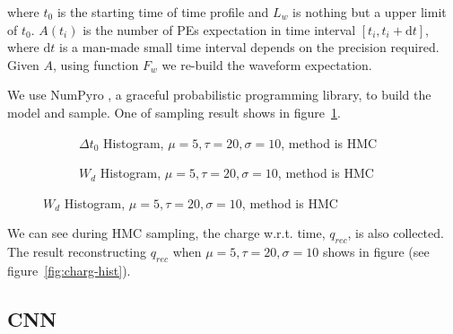 where $t_{0}$ is the starting time of time profile and $L_{w}$ is nothing but a upper limit of $t_{0}$. $A(t_{i})$ is the number of PEs expectation in time interval $[t_{i}, t_{i}+\mathrm{d}t]$, where $\mathrm{d}t$ is a man-made small time interval depends on the precision required. Given $A$, using function $F_{w}$ we re-build the waveform expectation. 

We use NumPyro \cite{phan2019composable}, a graceful probabilistic programming library, to build the model and sample. One of sampling result shows in figure~\ref{fig:mcmcrec-t0hist}. 

\begin{figure}[H]
\begin{minipage}[t]{.5\textwidth}
\begin{figure}[H]
    \centering
    \resizebox{\textwidth}{!}{}
    \caption{\label{fig:mcmcrec-t0hist} $\Delta t_{0}$ Histogram, $\mu=5, \tau=20, \sigma=10$, method is HMC}
\end{figure}
\end{minipage}
\begin{minipage}[t]{.5\textwidth}
\begin{figure}[H]
    \centering
    \resizebox{\textwidth}{!}{}
    \caption{\label{fig:mcmcrec-chargehist} $W_{d}$ Histogram, $\mu=5, \tau=20, \sigma=10$, method is HMC}
\end{figure}
\end{minipage}
\end{figure}

We can see during HMC sampling, the charge w.r.t. time, $q_{rec}$, is also collected. The result reconstructing $q_{rec}$ when $\mu=5, \tau=20, \sigma=10$ shows in figure (see figure~\ref{fig:charg-hist}). 

\subsection{CNN}


